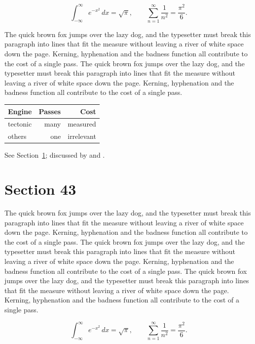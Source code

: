\documentclass{article}
\begin{document}
\begin{equation}\label{eq:42}
\int_{-\infty}^{\infty} e^{-x^{2}}\,dx = \sqrt{\pi}, \qquad
\sum_{n=1}^{\infty} \frac{1}{n^{2}} = \frac{\pi^{2}}{6}.
\end{equation}

The quick brown fox jumps over the lazy dog, and the typesetter must break this paragraph into lines that fit the measure without leaving a river of white space down the page. Kerning, hyphenation and the badness function all contribute to the cost of a single pass. The quick brown fox jumps over the lazy dog, and the typesetter must break this paragraph into lines that fit the measure without leaving a river of white space down the page. Kerning, hyphenation and the badness function all contribute to the cost of a single pass. 

\begin{center}
\begin{tabular}{lrr}
\toprule
Engine & Passes & Cost \\
\midrule
tectonic & many & measured \\
others & one & irrelevant \\
\bottomrule
\end{tabular}
\end{center}

See Section~\ref{sec:43}; discussed by \textcite{k3} and \textcite{l5}.
\section{Section 43}
\label{sec:43}
The quick brown fox jumps over the lazy dog, and the typesetter must break this paragraph into lines that fit the measure without leaving a river of white space down the page. Kerning, hyphenation and the badness function all contribute to the cost of a single pass. The quick brown fox jumps over the lazy dog, and the typesetter must break this paragraph into lines that fit the measure without leaving a river of white space down the page. Kerning, hyphenation and the badness function all contribute to the cost of a single pass. The quick brown fox jumps over the lazy dog, and the typesetter must break this paragraph into lines that fit the measure without leaving a river of white space down the page. Kerning, hyphenation and the badness function all contribute to the cost of a single pass. 

\begin{equation}\label{eq:43}
\int_{-\infty}^{\infty} e^{-x^{2}}\,dx = \sqrt{\pi}, \qquad
\sum_{n=1}^{\infty} \frac{1}{n^{2}} = \frac{\pi^{2}}{6}.
\end{equation}
\end{document}
